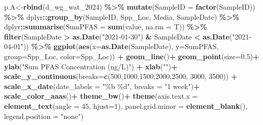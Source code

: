 \documentclass[
]{article}
\newenvironment{Shaded}{\begin{snugshade}}{\end{snugshade}}
\newcommand{\AttributeTok}[1]{\textcolor[rgb]{0.13,0.29,0.53}{#1}}
\newcommand{\DecValTok}[1]{\textcolor[rgb]{0.00,0.00,0.81}{#1}}
\newcommand{\FloatTok}[1]{\textcolor[rgb]{0.00,0.00,0.81}{#1}}
\newcommand{\FunctionTok}[1]{\textcolor[rgb]{0.13,0.29,0.53}{\textbf{#1}}}
\newcommand{\NormalTok}[1]{#1}
\newcommand{\OtherTok}[1]{\textcolor[rgb]{0.56,0.35,0.01}{#1}}
\newcommand{\SpecialCharTok}[1]{\textcolor[rgb]{0.81,0.36,0.00}{\textbf{#1}}}
\newcommand{\StringTok}[1]{\textcolor[rgb]{0.31,0.60,0.02}{#1}}
\begin{document}
\begin{Shaded}
\begin{Highlighting}[]
\NormalTok{p.A}\OtherTok{\textless{}{-}}\FunctionTok{rbind}\NormalTok{(d\_wg\_wat\_2024) }\SpecialCharTok{\%\textgreater{}\%}
  \FunctionTok{mutate}\NormalTok{(}\AttributeTok{SampleID =} \FunctionTok{factor}\NormalTok{(SampleID)) }\SpecialCharTok{\%\textgreater{}\%}
\NormalTok{  dplyr}\SpecialCharTok{::}\FunctionTok{group\_by}\NormalTok{(SampleID, Spp\_Loc, Media, SampleDate) }\SpecialCharTok{\%\textgreater{}\%}
\NormalTok{  dplyr}\SpecialCharTok{::}\FunctionTok{summarise}\NormalTok{(}\AttributeTok{SumPFAS =} \FunctionTok{sum}\NormalTok{(value, }\AttributeTok{na.rm =}\NormalTok{ T)) }\SpecialCharTok{\%\textgreater{}\%}
  \FunctionTok{filter}\NormalTok{(SampleDate }\SpecialCharTok{\textgreater{}} \FunctionTok{as.Date}\NormalTok{(}\StringTok{"2021{-}01{-}30"}\NormalTok{) }\SpecialCharTok{\&}\NormalTok{ SampleDate }\SpecialCharTok{\textless{}} \FunctionTok{as.Date}\NormalTok{(}\StringTok{"2021{-}04{-}01"}\NormalTok{)) }\SpecialCharTok{\%\textgreater{}\%}     \FunctionTok{ggplot}\NormalTok{(}\FunctionTok{aes}\NormalTok{(}\AttributeTok{x=}\FunctionTok{as.Date}\NormalTok{(SampleDate), }\AttributeTok{y=}\NormalTok{SumPFAS, }\AttributeTok{group=}\NormalTok{Spp\_Loc, }\AttributeTok{color=}\NormalTok{Spp\_Loc)) }\SpecialCharTok{+}
    \FunctionTok{geom\_line}\NormalTok{()}\SpecialCharTok{+}
    \FunctionTok{geom\_point}\NormalTok{(}\AttributeTok{size=}\FloatTok{0.5}\NormalTok{)}\SpecialCharTok{+}
    \FunctionTok{ylab}\NormalTok{(}\StringTok{"Sum PFAS Concentration (ng/L)"}\NormalTok{) }\SpecialCharTok{+}
    \FunctionTok{xlab}\NormalTok{(}\StringTok{""}\NormalTok{)}\SpecialCharTok{+}
    \FunctionTok{scale\_y\_continuous}\NormalTok{(}\AttributeTok{breaks=}\FunctionTok{c}\NormalTok{(}\DecValTok{500}\NormalTok{,}\DecValTok{1000}\NormalTok{,}\DecValTok{1500}\NormalTok{,}\DecValTok{2000}\NormalTok{,}\DecValTok{2500}\NormalTok{, }\DecValTok{3000}\NormalTok{, }\DecValTok{3500}\NormalTok{)) }\SpecialCharTok{+}
    \FunctionTok{scale\_x\_date}\NormalTok{(}\AttributeTok{date\_labels =} \StringTok{"\%b \%d"}\NormalTok{, }\AttributeTok{breaks =} \StringTok{"1 week"}\NormalTok{)}\SpecialCharTok{+}
    \FunctionTok{scale\_color\_aaas}\NormalTok{()}\SpecialCharTok{+}
    \FunctionTok{theme\_bw}\NormalTok{()}\SpecialCharTok{+}
    \FunctionTok{theme}\NormalTok{(}\AttributeTok{axis.text.x =} \FunctionTok{element\_text}\NormalTok{(}\AttributeTok{angle =} \DecValTok{45}\NormalTok{, }\AttributeTok{hjust=}\DecValTok{1}\NormalTok{),}
          \AttributeTok{panel.grid.minor =} \FunctionTok{element\_blank}\NormalTok{(),}
          \AttributeTok{legend.position =} \StringTok{"none"}\NormalTok{)}



\end{Highlighting}
\end{Shaded}
\end{document}
